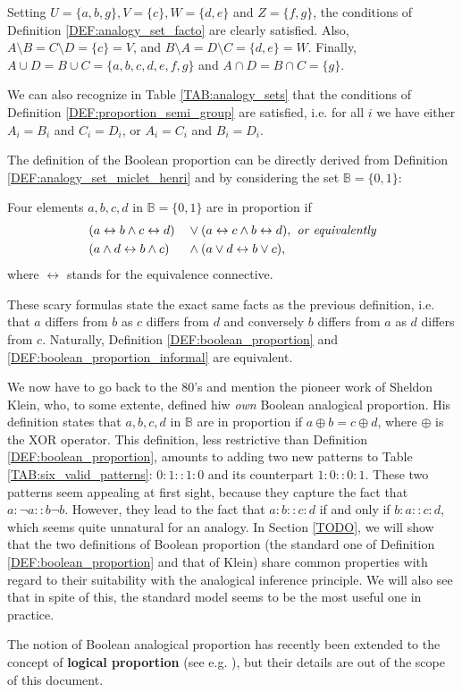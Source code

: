 Setting $U = \{a, b, g\}, V = \{c\}, W = \{d, e\}$ and $Z = \{f, g\}$, the
conditions of Definition  \ref{DEF:analogy_set_facto}  are clearly satisfied.
Also, $A \setminus B = C \setminus D = \{c\} = V$, and $B\setminus A = D
\setminus C = \{d, e\} = W$. Finally, $A \cup D = B \cup C = \{a, b, c, d, e,
f, g\}$ and $A\cap D = B\cap C = \{g\}$.

We can also recognize in Table \ref{TAB:analogy_sets} that the conditions of
Definition \ref{DEF:proportion_semi_group} are satisfied, i.e. for all $i$ we
have either $A_i = B_i$ and $C_i = D_i$, or $A_i = C_i$ and $B_i = D_i$.

The definition of the Boolean proportion can be directly derived from
Definition \ref{DEF:analogy_set_miclet_henri} and by considering the set
$\mathbb{B} = \{0, 1\}$:

\begin{definition}
  \label{DEF:boolean_proportion}
  Four elements $a, b, c, d$ in $\mathbb{B} = \{0, 1\}$ are in proportion if
  \begin{alignat*}{2}
    &(a \leftrightarrow b \wedge c \leftrightarrow d) && \vee (a
    \leftrightarrow c \wedge b \leftrightarrow d), \emph{ or equivalently}\\
     & (a \wedge d \leftrightarrow b \wedge c) &&\wedge (a \vee  d
    \leftrightarrow b \vee c),
  \end{alignat*}
  where $\leftrightarrow$ stands for the equivalence connective.
\end{definition}

These scary formulas state the exact same facts as the previous definition,
i.e. that $a$ differs from $b$ as $c$ differs from $d$ and conversely $b$
differs from $a$ as $d$ differs from $c$. Naturally, Definition
\ref{DEF:boolean_proportion} and \ref{DEF:boolean_proportion_informal} are
equivalent.

We now have to go back to the 80's and mention the pioneer work of Sheldon
Klein, who, to some extente, defined hiw \textit{own} Boolean analogical
proportion. His definition states that $a, b, c, d$ in $\mathbb{B}$ are in
proportion if $a \oplus b = c \oplus d$, where $\oplus$ is the XOR operator.
This definition, less restrictive than Definition \ref{DEF:boolean_proportion},
amounts to adding two new patterns to Table \ref{TAB:six_valid_patterns}:
$0:1::1:0$ and its counterpart $1:0::0:1$. These two patterns seem appealing at
first sight, because they capture the fact that $a : \neg a :: b \neg b$.
However, they lead to the fact that $a:b::c:d$ if and only if $b : a :: c :d$,
which seems quite unnatural for an analogy. In Section \ref{TODO}, we will show
that the two definitions of Boolean proportion (the standard one of Definition
\ref{DEF:boolean_proportion} and that of Klein) share common properties with
regard to their suitability with the analogical inference principle. We will
also see that in spite of this, the standard model seems to be the most useful
one in practice.

The notion of Boolean analogical proportion has recently been extended to the
concept of \textbf{logical proportion} (see e.g. \cite{PraRic14}), but their
details are out of the scope of this document.
